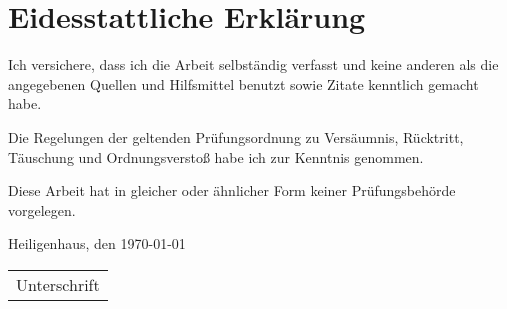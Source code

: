 \section*{Eidesstattliche Erklärung}
%
Ich versichere, dass ich die Arbeit selbständig verfasst und keine anderen als die angegebenen Quellen und Hilfsmittel benutzt sowie Zitate kenntlich gemacht habe.
%
\bigskip

Die Regelungen der geltenden Prüfungsordnung zu Versäumnis, Rücktritt, Täuschung und Ordnungsverstoß habe ich zur Kenntnis genommen.
%
\bigskip

Diese Arbeit hat in gleicher oder ähnlicher Form keiner Prüfungsbehörde vorgelegen.
%
\bigskip

%

\vspace{3cm}
Heiligenhaus, den \today
\hfill
\begin{tabular}[t]{@{}l@{}}\hline
\hspace*{2.5cm}Unterschrift\hspace*{2.5cm}
\end{tabular}
